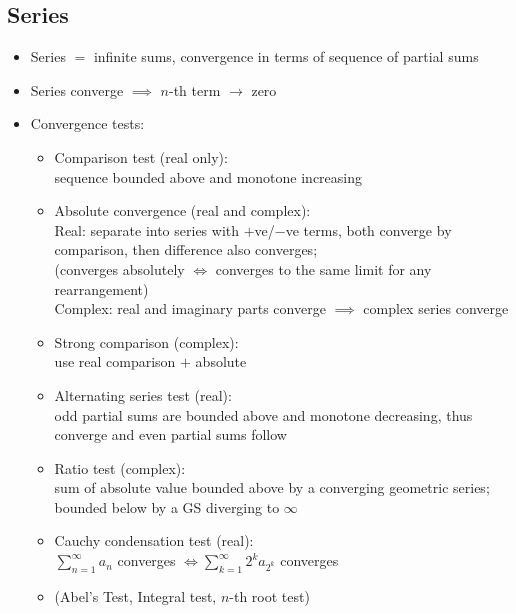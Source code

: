 \subsection*{Series}
\begin{itemize}
      \item Series $=$ infinite sums, convergence in terms of sequence of partial sums
      \item Series converge $\implies$ $n$-th term $\to$ zero
      \item Convergence tests:
            \begin{itemize}
                  \item Comparison test (real only): \\
                        sequence bounded above and monotone increasing
                  \item Absolute convergence (real and complex): \\
                        Real: separate into series with $+$ve/$-$ve terms, both converge by comparison, then difference also converges; \\(converges absolutely $\iff$ converges to the same limit for any rearrangement)\\
                        Complex: real and imaginary parts converge $\implies$ complex series converge
                  \item Strong comparison (complex): \\
                        use real comparison $+$ absolute
                  \item Alternating series test (real): \\
                        odd partial sums are bounded above and monotone decreasing, thus converge and even partial sums follow
                  \item Ratio test (complex): \\
                        sum of absolute value bounded above by a converging geometric series; bounded below by a GS diverging to $\infty$
                  \item Cauchy condensation test (real): \\
                        $ \sum_{n=1} ^{\infty} a_n $ converges $\iff \sum_{k=1} ^{\infty} 2^k a_{2^k}$ converges
                  \item (Abel's Test, Integral test, $n$-th root test)
            \end{itemize}
\end{itemize}

